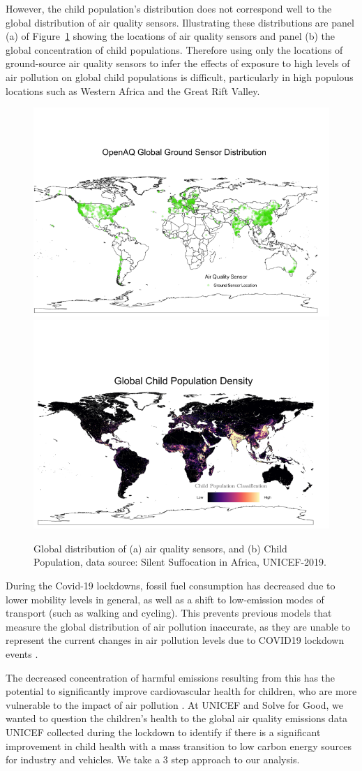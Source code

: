 However, the child population’s distribution does not correspond well to the global distribution of air quality sensors. Illustrating these distributions are panel (a) of Figure~\ref{fig:maps} showing the locations of air quality sensors and panel (b) the global concentration of child populations. Therefore using only the locations of ground-source air quality sensors to infer the effects of exposure to high levels of air pollution on global child populations is difficult, particularly in high populous locations such as Western Africa and the Great Rift Valley.

\begin{figure}
    \centering
    \includegraphics[width=.49\textwidth]{sensormap.png}
    \includegraphics[width=.49\textwidth]{childmap.png}
    \caption{Global distribution of (a) air quality sensors, and (b) Child Population, data source: Silent Suffocation in Africa, UNICEF-2019.}
    \label{fig:maps}
\end{figure}

During the Covid-19 lockdowns, fossil fuel consumption has decreased due to lower mobility levels in general, as well as a shift to low-emission modes of transport (such as walking and cycling). This prevents previous models that measure the global distribution of air pollution inaccurate, as they are unable to represent the current changes in air pollution levels due to COVID19 lockdown events \cite{stateof}.

The decreased concentration of harmful emissions resulting from this has the potential to significantly improve cardiovascular health for children, who are more vulnerable to the impact of air pollution \cite{Rees}. At UNICEF and Solve for Good, we wanted to question the children’s health to the global air quality emissions data UNICEF collected during the lockdown to identify if there is a significant improvement in child health with a mass transition to low carbon energy sources for industry and vehicles.
We take a 3 step approach to our analysis.

